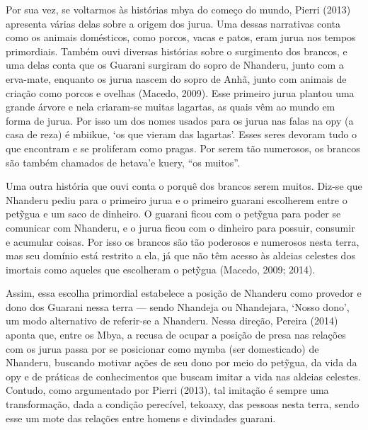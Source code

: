\documentclass{article}
\begin{document}
Por sua vez, se voltarmos \`as hist\'orias mbya do come\c{c}o do mundo,
Pierri (2013) apresenta v\'arias delas sobre a origem dos jurua. Uma
dessas narrativas conta como os animais dom\'esticos, como porcos,
vacas e patos, eram jurua nos tempos primordiais. Tamb\'em ouvi
diversas hist\'orias sobre o surgimento dos brancos, e uma delas conta
que os Guarani surgiram do sopro de Nhanderu, junto com a erva-mate,
enquanto os jurua nascem do sopro de Anh\~a, junto com animais de
cria\c{c}\~ao como porcos e ovelhas (Macedo, 2009). Esse primeiro jurua
plantou uma grande \'arvore e nela criaram-se muitas lagartas, as quais
v\^em ao mundo em forma de jurua. Por isso um dos nomes usados para os
jurua nas falas na opy (a casa de reza) \'e mbiikue, {\textquoteleft}os
que vieram das lagartas{\textquoteright}. Esses seres devoram tudo o
que encontram e se proliferam como pragas. Por serem t\~ao numerosos,
os brancos s\~ao tamb\'em chamados de hetava{\textquoteright}e kuery,
{\textquotedblleft}os muitos{\textquotedblright}.

Uma outra hist\'oria que ouvi conta o porqu\^e dos brancos serem muitos.
Diz-se que Nhanderu pediu para o primeiro jurua e o primeiro guarani
escolherem entre o pet\~{y}gua e um saco de dinheiro. O guarani ficou
com o pet\~{y}gua para poder se comunicar com Nhanderu, e o jurua ficou
com o dinheiro para possuir, consumir e acumular coisas. Por isso os
brancos s\~ao t\~ao poderosos e numerosos nesta terra, mas seu
dom\'inio est\'a restrito a ela, j\'a que n\~ao t\^em acesso \`as
aldeias celestes dos imortais como aqueles que escolheram o pet\~{y}gua
(Macedo, 2009; 2014). 

Assim, essa escolha primordial estabelece a posi\c{c}\~ao de Nhanderu
como provedor e dono dos Guarani nessa terra --- sendo Nhandeja ou
Nhandejara, {\textquoteleft}Nosso dono{\textquoteright}, um modo
alternativo de referir-se a Nhanderu. Nessa dire\c{c}\~ao, Pereira
(2014) aponta que, entre os Mbya, a recusa de ocupar a posi\c{c}\~ao de
presa nas rela\c{c}\~oes com os jurua passa por se posicionar como
mymba (ser domesticado) de Nhanderu, buscando motivar a\c{c}\~oes de
seu dono por meio do pet\~{y}gua, da vida da opy e de pr\'aticas de
conhecimentos que buscam imitar a vida nas aldeias celestes. Contudo,
como argumentado por Pierri (2013), tal imita\c{c}\~ao \'e sempre uma
transforma\c{c}\~ao, dada a condi\c{c}\~ao perec\'ivel, tekoaxy, das
pessoas nesta terra, sendo esse um mote das rela\c{c}\~oes entre homens
e divindades guarani.
\end{document}
